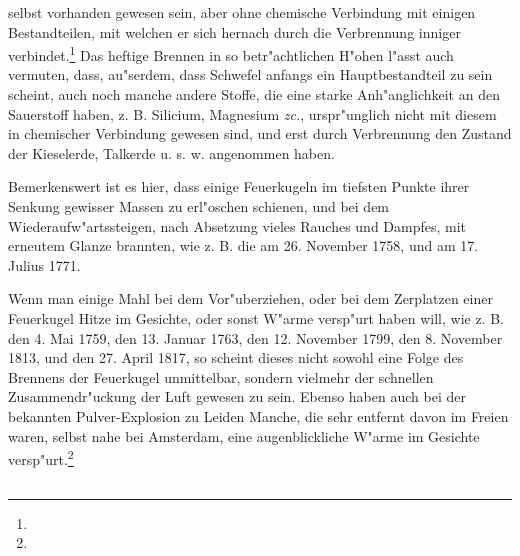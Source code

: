 \documentclass[a4paper, 11pt, oneside, polutonikogreek, german]{article}
\begin{document}
selbst vorhanden gewesen sein, aber ohne chemische Verbindung mit einigen Bestandteilen, mit welchen er sich hernach durch die Verbrennung inniger verbindet.\footnote{} Das heftige Brennen in so betr"achtlichen H"ohen l"asst auch vermuten, dass, au"serdem, dass Schwefel anfangs ein Hauptbestandteil zu sein scheint, auch noch manche andere Stoffe, die eine starke Anh"anglichkeit an den Sauerstoff haben, z. B. Silicium, Magnesium \emph{zc.}, urspr"unglich nicht mit diesem in chemischer Verbindung gewesen sind, und erst durch Verbrennung den Zustand der Kieselerde, Talkerde u. s. w. angenommen haben.

Bemerkenswert ist es hier, dass einige Feuerkugeln im tiefsten Punkte ihrer Senkung gewisser Massen zu erl"oschen schienen, und bei dem Wiederaufw"artssteigen, nach Absetzung vieles Rauches und Dampfes, mit erneutem Glanze brannten, wie z. B. die am 26. November 1758, und am 17. Julius 1771.

Wenn man einige Mahl bei dem Vor"uberziehen, oder bei dem Zerplatzen einer Feuerkugel Hitze im Gesichte, oder sonst W"arme versp"urt haben will, wie z. B. den 4. Mai 1759, den 13. Januar 1763, den 12. November 1799, den 8. November 1813, und den 27. April 1817, so scheint dieses nicht sowohl eine Folge des Brennens der Feuerkugel unmittelbar, sondern vielmehr der schnellen Zusammendr"uckung der Luft gewesen zu sein. Ebenso haben auch bei der bekannten Pulver-Explosion zu Leiden Manche, die sehr entfernt davon im Freien waren, selbst nahe bei Amsterdam, eine augenblickliche W"arme im Gesichte versp"urt.\footnote{}
\subsection{}
\end{document}
